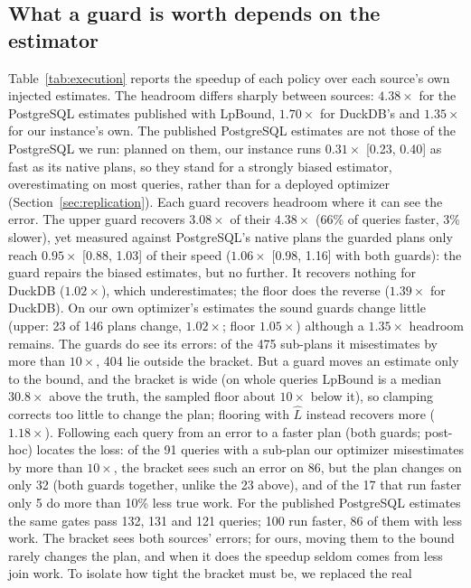 \documentclass[sigconf, nonacm]{acmart}
\begin{document}
\subsection{What a guard is worth depends on the estimator}
Table~\ref{tab:execution} reports the speedup of each policy over each
source's own injected estimates. The headroom differs sharply between sources:
$4.38\times$ for the PostgreSQL estimates published with LpBound,
$1.70\times$ for DuckDB's and $1.35\times$ for our instance's own. The
published PostgreSQL estimates are not those of the PostgreSQL we run: planned
on them, our instance runs $0.31\times$ [0.23, 0.40] as fast as its native
plans, so they stand for a strongly biased estimator, overestimating on most
queries, rather than for a deployed optimizer (Section~\ref{sec:replication}).
Each guard recovers headroom where it can see the error. The upper guard
recovers $3.08\times$ of their $4.38\times$ (66\% of queries faster, 3\%
slower), yet measured against PostgreSQL's native plans the guarded plans only
reach $0.95\times$ [0.88, 1.03] of their speed ($1.06\times$ [0.98, 1.16] with
both guards): the guard repairs the biased estimates, but no further. It
recovers nothing for DuckDB ($1.02\times$), which underestimates; the floor does
the reverse ($1.39\times$ for DuckDB). On our own optimizer's estimates the
sound guards change little (upper: 23 of 146 plans change, $1.02\times$; floor
$1.05\times$) although a $1.35\times$ headroom remains. The guards do see its
errors: of the 475 sub-plans it misestimates by more than $10\times$, 404 lie
outside the bracket. But a guard moves an estimate only to the bound, and the
bracket is wide (on whole queries LpBound is a median $30.8\times$ above the
truth, the sampled floor about $10\times$ below it), so clamping corrects too little to change the
plan; flooring with $\hat L$ instead recovers more ($1.18\times$). Following
each query from an error to a faster plan (both guards; post-hoc) locates the
loss: of the 91 queries with a sub-plan our optimizer misestimates by more than
$10\times$, the bracket sees such an error on 86, but the plan changes on only
32 (both guards together, unlike the 23 above), and of the 17 that run faster
only 5 do more than 10\% less true work. For the published PostgreSQL estimates
the same gates pass 132, 131 and 121 queries; 100 run faster, 86 of them with
less work. The bracket sees both sources' errors; for ours, moving them to the
bound rarely changes the plan, and when it does the speedup seldom comes from
less join work. To isolate how tight the bracket must be, we replaced the real
\end{document}
